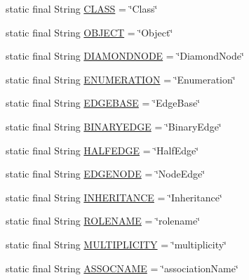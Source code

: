 \begin{DoxyCompactItemize}
\item 
static final String \hyperlink{classorg_1_1tzi_1_1use_1_1gui_1_1xmlparser_1_1_layout_tags_a426e8b3bfbb6fa85e2d2c844813355c4}{C\-L\-A\-S\-S} = \char`\"{}Class\char`\"{}
\item 
static final String \hyperlink{classorg_1_1tzi_1_1use_1_1gui_1_1xmlparser_1_1_layout_tags_a379e9ca35e31fc181aa75deca984f338}{O\-B\-J\-E\-C\-T} = \char`\"{}Object\char`\"{}
\item 
static final String \hyperlink{classorg_1_1tzi_1_1use_1_1gui_1_1xmlparser_1_1_layout_tags_a064efcfb396623a71caa5390834a87f7}{D\-I\-A\-M\-O\-N\-D\-N\-O\-D\-E} = \char`\"{}Diamond\-Node\char`\"{}
\item 
static final String \hyperlink{classorg_1_1tzi_1_1use_1_1gui_1_1xmlparser_1_1_layout_tags_ad4781ead16db01051179e20726745fa1}{E\-N\-U\-M\-E\-R\-A\-T\-I\-O\-N} = \char`\"{}Enumeration\char`\"{}
\item 
static final String \hyperlink{classorg_1_1tzi_1_1use_1_1gui_1_1xmlparser_1_1_layout_tags_a3a29d75f4881193ac7b30cfee0bfb6e7}{E\-D\-G\-E\-B\-A\-S\-E} = \char`\"{}Edge\-Base\char`\"{}
\item 
static final String \hyperlink{classorg_1_1tzi_1_1use_1_1gui_1_1xmlparser_1_1_layout_tags_aade4f507d70be7ae48f2f1ede42ad267}{B\-I\-N\-A\-R\-Y\-E\-D\-G\-E} = \char`\"{}Binary\-Edge\char`\"{}
\item 
static final String \hyperlink{classorg_1_1tzi_1_1use_1_1gui_1_1xmlparser_1_1_layout_tags_aa2ee4cf5fdb7248e726f25f4db4c02ab}{H\-A\-L\-F\-E\-D\-G\-E} = \char`\"{}Half\-Edge\char`\"{}
\item 
static final String \hyperlink{classorg_1_1tzi_1_1use_1_1gui_1_1xmlparser_1_1_layout_tags_a9e00e4d99bb32893c84081e1f51642b4}{E\-D\-G\-E\-N\-O\-D\-E} = \char`\"{}Node\-Edge\char`\"{}
\item 
static final String \hyperlink{classorg_1_1tzi_1_1use_1_1gui_1_1xmlparser_1_1_layout_tags_ac8776fa9a54cc94bec4a2ff7a21ba836}{I\-N\-H\-E\-R\-I\-T\-A\-N\-C\-E} = \char`\"{}Inheritance\char`\"{}
\item 
static final String \hyperlink{classorg_1_1tzi_1_1use_1_1gui_1_1xmlparser_1_1_layout_tags_a87f13bc6f6919da479f9881f1734c4a3}{R\-O\-L\-E\-N\-A\-M\-E} = \char`\"{}rolename\char`\"{}
\item 
static final String \hyperlink{classorg_1_1tzi_1_1use_1_1gui_1_1xmlparser_1_1_layout_tags_acd1fd0cb04685ab57ffa3f59e11a2976}{M\-U\-L\-T\-I\-P\-L\-I\-C\-I\-T\-Y} = \char`\"{}multiplicity\char`\"{}
\item 
static final String \hyperlink{classorg_1_1tzi_1_1use_1_1gui_1_1xmlparser_1_1_layout_tags_a440dfb0a9d2385eab2e629ca0589be06}{A\-S\-S\-O\-C\-N\-A\-M\-E} = \char`\"{}association\-Name\char`\"{}

\end{DoxyCompactItemize}
